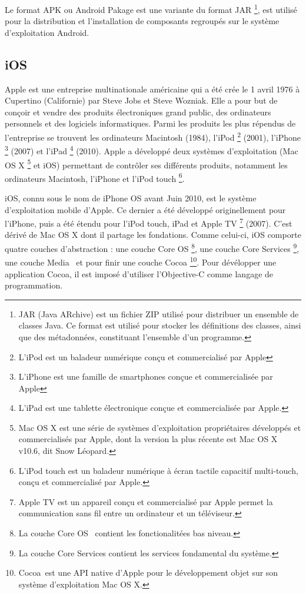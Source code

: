 	Le format APK ou Android Pakage est une variante du format
	JAR \footnote{JAR (Java ARchive) est un fichier ZIP utilisé pour distribuer un
	ensemble de classes Java. Ce format est utilisé pour stocker les définitions
	des  classes, ainsi que des métadonnées, constituant l'ensemble d'un
	programme.},  est utilisé pour la distribution et l'installation de composants
	regroupés sur le système d'exploitation Android.


\subsection{iOS}
	Apple est une entreprise multinationale américaine qui a été crée le 1 avril 1976 à Cupertino (Californie) par Steve Jobs et Steve Wozniak. Elle a pour but de conçoir et vendre des produits électroniques grand public, des ordinateurs personnels et des logiciels informatiques. Parmi les produits les plus répendus de l'entreprise se trouvent les ordinateurs Macintosh (1984), l'iPod \footnote{L'iPod est un baladeur numérique conçu et commercialisé par Apple} (2001), l'iPhone \footnote{L'iPhone est une famille de smartphones conçue et commercialisée par Apple}  (2007) et l'iPad \footnote{L'iPad est une tablette électronique conçue et commercialisée par Apple.} (2010). Apple a développé deux systèmes d'exploitation (Mac OS X \footnote{Mac OS X est une série de systèmes d’exploitation propriétaires développés et commercialisés par Apple, dont la version la plus récente est Mac OS X v10.6, dit Snow Léopard.} et iOS) permettant de contrôler ses différents produits, notamment les ordinateurs Macintosh, l'iPhone et l'iPod touch \footnote{L’iPod touch est un baladeur numérique à écran tactile capacitif multi-touch, conçu et commercialisé par Apple.}.
			
	iOS, connu sous le nom de iPhone OS avant Juin 2010, est le système d'exploitation mobile d'Apple. Ce dernier a été développé originellement pour l'iPhone, puis a été étendu pour l'iPod touch, iPad  et Apple TV \footnote{Apple TV est un appareil conçu et commercialisé par Apple permet la communication sans fil entre un ordinateur et un téléviseur.} (2007). C'est dérivé de Mac OS X  dont il partage les fondations. Comme celui-ci, iOS comporte quatre couches d'abstraction : une couche \og Core OS \fg \footnote{La couche \og Core OS \fg \,  contient les fonctionalitées bas niveau.}, une couche \og Core Services \fg \footnote{La couche \og Core Services \fg contient les services fondamental du système.}, une couche \og Media \fg \, et pour finir une couche \og Cocoa \fg \footnote{\og Cocoa \fg \,est une API native d'Apple pour le développement objet sur son système d'exploitation Mac OS X.}. Pour dévélopper une application Cocoa, il est imposé d'utiliser l'Objective-C comme langage de programmation.
			

